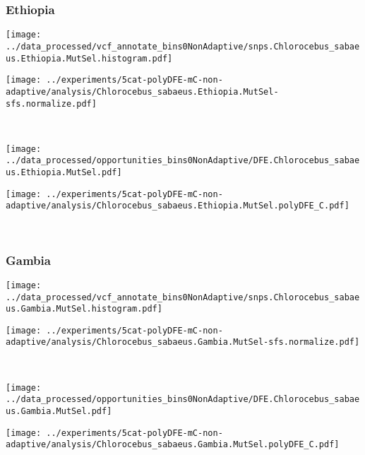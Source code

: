 \subsubsection{Ethiopia}

\begin{minipage}{0.49\linewidth}
    \texttt{[image: ../data\_processed/vcf\_annotate\_bins0NonAdaptive/snps.Chlorocebus\_sabaeus.Ethiopia.MutSel.histogram.pdf]}
\end{minipage}
\begin{minipage}{0.49\linewidth}
    \texttt{[image: ../experiments/5cat-polyDFE-mC-non-adaptive/analysis/Chlorocebus\_sabaeus.Ethiopia.MutSel-sfs.normalize.pdf]}
\end{minipage}
\\
\begin{minipage}{0.49\linewidth}
    \texttt{[image: ../data\_processed/opportunities\_bins0NonAdaptive/DFE.Chlorocebus\_sabaeus.Ethiopia.MutSel.pdf]}
\end{minipage}
\begin{minipage}{0.49\linewidth}
    \texttt{[image: ../experiments/5cat-polyDFE-mC-non-adaptive/analysis/Chlorocebus\_sabaeus.Ethiopia.MutSel.polyDFE\_C.pdf]}
\end{minipage}
\\

\subsubsection{Gambia}

\begin{minipage}{0.49\linewidth}
    \texttt{[image: ../data\_processed/vcf\_annotate\_bins0NonAdaptive/snps.Chlorocebus\_sabaeus.Gambia.MutSel.histogram.pdf]}
\end{minipage}
\begin{minipage}{0.49\linewidth}
    \texttt{[image: ../experiments/5cat-polyDFE-mC-non-adaptive/analysis/Chlorocebus\_sabaeus.Gambia.MutSel-sfs.normalize.pdf]}
\end{minipage}
\\
\begin{minipage}{0.49\linewidth}
    \texttt{[image: ../data\_processed/opportunities\_bins0NonAdaptive/DFE.Chlorocebus\_sabaeus.Gambia.MutSel.pdf]}
\end{minipage}
\begin{minipage}{0.49\linewidth}
    \texttt{[image: ../experiments/5cat-polyDFE-mC-non-adaptive/analysis/Chlorocebus\_sabaeus.Gambia.MutSel.polyDFE\_C.pdf]}
\end{minipage}
\\

